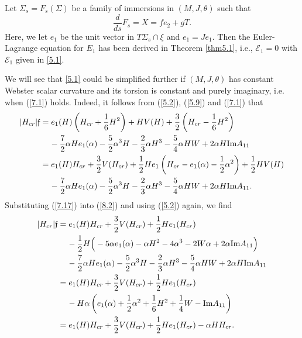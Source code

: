 \documentclass{amsart}
\theoremstyle{Corollary}
\numberwithin{equation}{section}
\begin{document}
Let 
$\Sigma_s=F_s(\Sigma)$
be a family of immersions in $(M,J,\theta)$ such that 
\begin{equation}\label{8.1}
\frac{d}{ds}F_s=X=fe_2+gT.
\end{equation}
Here, we let $e_1$ be the unit vector in $T\Sigma_s\cap\xi$
and $e_1=Je_1$. 
Then the Euler-Lagrange equation for $E_1$ has been derived in Theorem \ref{thm5.1}, i.e., 
$\mathcal{E}_1=0$ with $\mathcal{E}_1$ given in \eqref{5.1}. 

We will see that \eqref{5.1} could be simplified further if 
 $(M,J,\theta)$
has constant Webster scalar curvature and 
its torsion is constant and purely imaginary, i.e. when (\ref{7.1}) holds.  
Indeed, it follows from (\ref{5.2}), (\ref{5.9}) and (\ref{7.1}) that 
\begin{equation}\label{8.2}
\begin{split}
|H_{cr}|\mathfrak{f}
&=e_1(H)\left(H_{cr}+\frac{1}{6}H^2\right)+HV(H)+\frac{3}{2}\left(H_{cr}-\frac{1}{6}H^2\right)\\
&\hspace{4mm}-\frac{7}{2}\alpha H e_1(\alpha)-\frac{5}{2}\alpha^3H-\frac{2}{3}\alpha H^3-\frac{5}{4}\alpha H W
+2\alpha H\mbox{Im} A_{11}\\
&=e_1(H) H_{cr}+\frac{3}{2}V(H_{cr})+\frac{1}{2}H e_1\left(H_{cr}-e_1(\alpha)-\frac{1}{2}\alpha^2\right)+\frac{1}{2}HV(H)\\
&\hspace{4mm}-\frac{7}{2}\alpha H e_1(\alpha)-\frac{5}{2}\alpha^3H-\frac{2}{3}\alpha H^3-\frac{5}{4}\alpha H W
+2\alpha H\mbox{Im} A_{11}.
\end{split}
\end{equation}
Substituting 
(\ref{7.17}) into (\ref{8.2}) 
and using (\ref{5.2}) again, 
we find  
\begin{equation}\label{8.3}
\begin{split}
|H_{cr}|\mathfrak{f}
&=e_1(H) H_{cr}+\frac{3}{2}V(H_{cr})+\frac{1}{2}H e_1(H_{cr})\\
&\hspace{4mm}-\frac{1}{2}H\Big(-5\alpha e_1(\alpha)-\alpha H^2-4\alpha^3-2W\alpha+2\alpha\mbox{Im}A_{11}\Big)\\
&\hspace{4mm}-\frac{7}{2}\alpha H e_1(\alpha)-\frac{5}{2}\alpha^3H-\frac{2}{3}\alpha H^3-\frac{5}{4}\alpha H W
+2\alpha H\mbox{Im} A_{11}\\
&=e_1(H) H_{cr}+\frac{3}{2}V(H_{cr})+\frac{1}{2}H e_1(H_{cr})\\
&\hspace{4mm}
-H\alpha\left(e_1(\alpha)+\frac{1}{2}\alpha^2+\frac{1}{6}H^2+\frac{1}{4}W-\mbox{Im} A_{11}\right)\\
&=e_1(H) H_{cr}+\frac{3}{2}V(H_{cr})+\frac{1}{2}H e_1(H_{cr})
-\alpha H H_{cr}. 
\end{split}
\end{equation}
\end{document}
